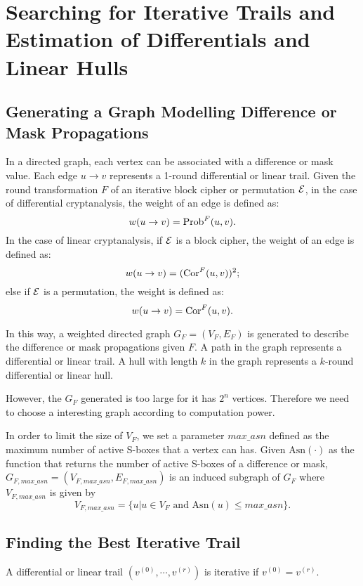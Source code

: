 \section{Searching for Iterative Trails and Estimation of Differentials and Linear Hulls\label{sec:method}}

\subsection{Generating a Graph Modelling Difference or Mask Propagations}

In a directed graph, each vertex can be associated with a difference or mask value. Each edge $u\rightarrow v$ represents a 1-round differential or linear trail. Given the round transformation $F$ of an iterative block cipher or permutation $\mathcal{E}$, in the case of differential cryptanalysis, the weight of an edge is defined as:
\[
    w(u\rightarrow v)=\text{Prob}^{F}(u,v).
\]
In the case of linear cryptanalysis, if $\mathcal{E}$ is a block cipher, the weight of an edge is defined as:
\[
    w(u\rightarrow v)=(\text{Cor}^{F}(u,v))^2;
\]
else if $\mathcal{E}$ is a permutation, the weight is defined as:
\[
    w(u\rightarrow v)=\text{Cor}^{F}(u,v).
\]

In this way, a weighted directed graph $G_{F}=(V_{F},E_{F})$ is generated to describe the difference or mask propagations given $F$. A path in the graph represents a differential or linear trail. A hull with length $k$ in the graph represents a $k$-round differential or linear hull. 

However, the $G_F$ generated is too large for it has $2^n$ vertices. Therefore we need to choose a interesting graph according to computation power. 

In order to limit the size of $V_F$, we set a parameter $max\_asn$ defined as the maximum number of active S-boxes that a vertex can has. Given $\text{Asn}(\cdot)$ as the function that returns the number of active S-boxes of a difference or mask, $G_{F,max\_asn}=(V_{F,max\_asn},E_{F,max\_asn})$ is an induced subgraph of $G_F$ where $V_{F,max\_asn}$ is given by
\[
    V_{F,max\_asn}=\{u|u\in V_F \text{ and } \text{Asn}(u)\leq max\_asn\}.
\]

\subsection{Finding the Best Iterative Trail}\label{sec:fbit}

\begin{definition}\label{def:it}
	A differential or linear trail $(v^{(0)},\cdots,v^{(r)})$ is iterative if $v^{(0)}=v^{(r)}$.
\end{definition}

